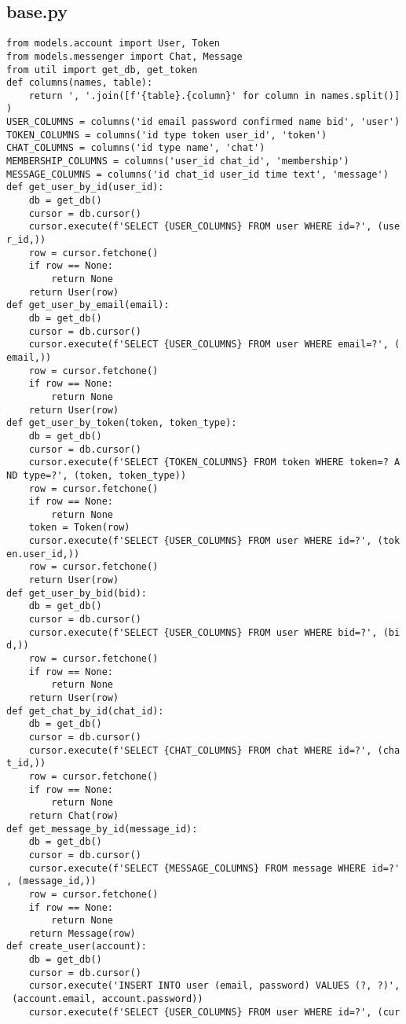 \documentclass[listing]{espd}
\begin{document}
\subsection{base.py}
\begin{verbatim}
from models.account import User, Token
from models.messenger import Chat, Message
from util import get_db, get_token
def columns(names, table):
    return ', '.join([f'{table}.{column}' for column in names.split()]
)
USER_COLUMNS = columns('id email password confirmed name bid', 'user')
TOKEN_COLUMNS = columns('id type token user_id', 'token')
CHAT_COLUMNS = columns('id type name', 'chat')
MEMBERSHIP_COLUMNS = columns('user_id chat_id', 'membership')
MESSAGE_COLUMNS = columns('id chat_id user_id time text', 'message')
def get_user_by_id(user_id):
    db = get_db()
    cursor = db.cursor()
    cursor.execute(f'SELECT {USER_COLUMNS} FROM user WHERE id=?', (use
r_id,))
    row = cursor.fetchone()
    if row == None:
        return None
    return User(row)
def get_user_by_email(email):
    db = get_db()
    cursor = db.cursor()
    cursor.execute(f'SELECT {USER_COLUMNS} FROM user WHERE email=?', (
email,))
    row = cursor.fetchone()
    if row == None:
        return None
    return User(row)
def get_user_by_token(token, token_type):
    db = get_db()
    cursor = db.cursor()
    cursor.execute(f'SELECT {TOKEN_COLUMNS} FROM token WHERE token=? A
ND type=?', (token, token_type))
    row = cursor.fetchone()
    if row == None:
        return None
    token = Token(row)
    cursor.execute(f'SELECT {USER_COLUMNS} FROM user WHERE id=?', (tok
en.user_id,))
    row = cursor.fetchone()
    return User(row)
def get_user_by_bid(bid):
    db = get_db()
    cursor = db.cursor()
    cursor.execute(f'SELECT {USER_COLUMNS} FROM user WHERE bid=?', (bi
d,))
    row = cursor.fetchone()
    if row == None:
        return None
    return User(row)
def get_chat_by_id(chat_id):
    db = get_db()
    cursor = db.cursor()
    cursor.execute(f'SELECT {CHAT_COLUMNS} FROM chat WHERE id=?', (cha
t_id,))
    row = cursor.fetchone()
    if row == None:
        return None
    return Chat(row)
def get_message_by_id(message_id):
    db = get_db()
    cursor = db.cursor()
    cursor.execute(f'SELECT {MESSAGE_COLUMNS} FROM message WHERE id=?'
, (message_id,))
    row = cursor.fetchone()
    if row == None:
        return None
    return Message(row)
def create_user(account):
    db = get_db()
    cursor = db.cursor()
    cursor.execute('INSERT INTO user (email, password) VALUES (?, ?)',
 (account.email, account.password))
    cursor.execute(f'SELECT {USER_COLUMNS} FROM user WHERE id=?', (cur

\end{verbatim}
\end{document}
